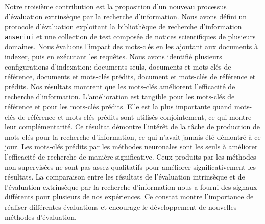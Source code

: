 Notre troisième contribution est la proposition d'un nouveau processus d'évaluation extrinsèque par la recherche d'information.
Nous avons défini un protocole d'évaluation exploitant la bibliothèque de recherche d'information \texttt{anserini} et une collection de test composée de notices scientifiques de plusieurs domaines. Nous évaluons l'impact des mots-clés en les ajoutant aux documents à indexer, puis en exécutant les requêtes.
Nous avons identifié plusieurs configurations d'indexation: documents seuls, documents et mots-clés de référence, documents et mots-clés prédits, document et mots-clés de référence et prédits.
%
Nos résultats montrent que les mots-clés améliorent l'efficacité de recherche d'information. L'amélioration est tangible pour les mots-clés de référence et pour les mots-clés prédits.
Elle est la plus importante quand mots-clés de référence et mots-clés prédits sont utilisés conjointement, ce qui montre leur complémentarité.
Ce résultat démontre l'intérêt de la tâche de production de mots-clés pour la recherche d'information, ce qui n'avait jamais été démontré à ce jour. 
%
Les mots-clés prédits par les méthodes neuronales sont les seuls à améliorer l'efficacité de recherche de manière significative.
Ceux produits par les méthodes non-supervisées ne sont pas assez qualitatifs pour améliorer significativement les résultats.
La comparaison entre les résultats de l'évaluation intrinsèque et de l'évaluation extrinsèque par la recherche d'information nous a fourni des signaux différents pour plusieurs de nos expériences. Ce constat montre l'importance de réaliser différentes évaluations et encourage le développement de nouvelles méthodes d'évaluation.

